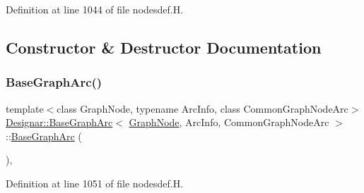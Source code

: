 Definition at line 1044 of file nodesdef.\+H.



\subsection{Constructor \& Destructor Documentation}
\mbox{\label{class_designar_1_1_base_graph_arc_ab68bc29411653f2d8b12d3ccc5efc1e7}} 
\subsubsection{\texorpdfstring{Base\+Graph\+Arc()}{BaseGraphArc()}\hspace{0.1cm}{\footnotesize\ttfamily [1/4]}}
{\footnotesize\ttfamily template$<$class Graph\+Node, typename Arc\+Info, class Common\+Graph\+Node\+Arc$>$ \\
\hyperlink{class_designar_1_1_base_graph_arc}{Designar\+::\+Base\+Graph\+Arc}$<$ \hyperlink{class_designar_1_1_graph_node}{Graph\+Node}, Arc\+Info, Common\+Graph\+Node\+Arc $>$\+::\hyperlink{class_designar_1_1_base_graph_arc}{Base\+Graph\+Arc} (\begin{DoxyParamCaption}{ }\end{DoxyParamCaption})\hspace{0.3cm}{\ttfamily [inline]}, {\ttfamily [protected]}}



Definition at line 1051 of file nodesdef.\+H.

\mbox{\label{class_designar_1_1_base_graph_arc_a1a789ba5e3fdb980a066bb56aa258681}} 
